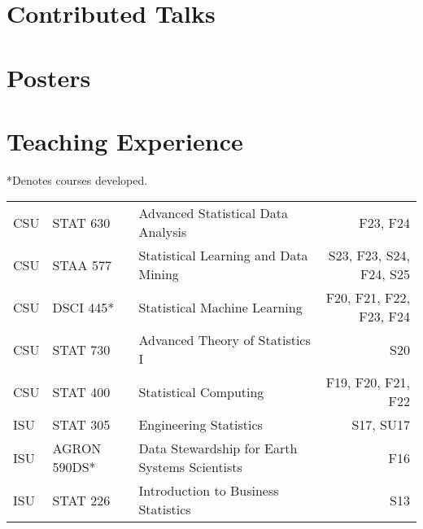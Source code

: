 \documentclass[margin,line]{res}
\begin{document}
\begin{resume}


\section{\sc Contributed Talks}
\printbibliography[keyword=talk-contributed, heading=none, resetnumbers=true]

\section{\sc Posters}
\printbibliography[keyword=poster, heading=none, resetnumbers=true]

\section{\sc Teaching Experience}
*Denotes courses developed.\\

\vspace{-.4cm}

\begin{table}[H]
\begin{tabular}{l l l r}
CSU & STAT 630 & Advanced Statistical Data Analysis & F23, F24 \\
CSU & STAA 577 & Statistical Learning and Data Mining  & S23, F23, S24, F24, S25 \\
CSU & DSCI 445* & Statistical Machine Learning & F20, F21, F22, F23, F24 \\
CSU & STAT 730 & Advanced Theory of Statistics I & S20 \\
CSU & STAT 400 & Statistical Computing & F19, F20, F21, F22 \\
ISU & STAT 305 & Engineering Statistics & S17, SU17 \\
ISU & AGRON 590DS* & Data Stewardship for Earth Systems Scientists & F16 \\
ISU & STAT 226 & Introduction to Business Statistics & S13 \\
\end{tabular}
\end{table}


\end{resume}
\end{document}
